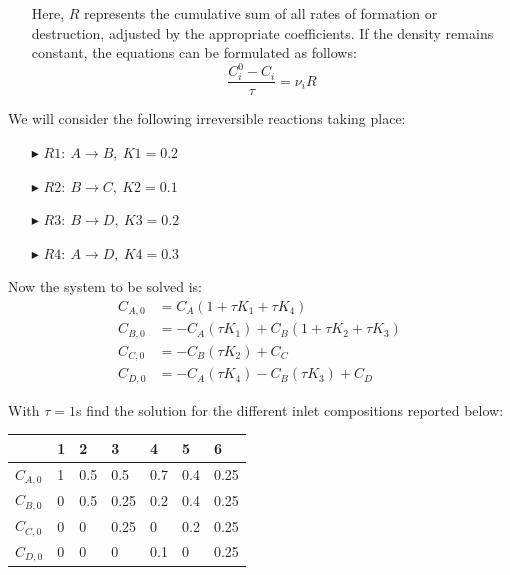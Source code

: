 \documentclass[xcolor={dvipsnames,rgb}, aspectratio=169]{beamer}
\begin{document}
\begin{frame}{}
   \begin{itemize}
      \item[ ] Here, $R$ represents the cumulative sum of all rates of formation or
         destruction, adjusted by the appropriate coefficients. If the density remains
         constant, the equations can be formulated as follows:
         \begin{equation*}
            \frac{C_{i}^{0}-C_{i}}{\tau} = \nu_{i}R
         \end{equation*}
   \end{itemize}
   We will consider the following irreversible reactions taking place:
   \begin{itemize}
      \item[$\blacktriangleright$] $R1:\: A\longrightarrow B,\: K1=0.2$
      \item[$\blacktriangleright$] $R2:\: B\longrightarrow C,\: K2=0.1$
      \item[$\blacktriangleright$] $R3:\: B\longrightarrow D,\: K3=0.2$
      \item[$\blacktriangleright$] $R4:\: A\longrightarrow D,\: K4=0.3$
   \end{itemize}
\end{frame}

\begin{frame}{}
   Now the system to be solved is:\\
   \begin{align*}
      C_{A,0} &= C_{A}\left(1+\tau K_{1} + \tau K_{4}\right) \\
      C_{B,0} &= -C_{A}\left(\tau K_{1}\right) + C_{B}\left(1+\tau K_{2} + \tau K_{3}\right) \\
      C_{C,0} &= -C_{B}\left(\tau K_{2}\right) + C_{C} \\
      C_{D,0} &= -C_{A}\left(\tau K_{4}\right)-C_{B}\left(\tau K_{3}\right) + C_{D}
   \end{align*}

   With $\tau = 1$s find the solution for the different inlet compositions reported
   below:
   \begin{table}
   \centering
   \begin{tabular}{l|l|l|l|l|l|l}
      & 1 & 2   & 3    & 4   & 5   & 6     \\
      \hline
      $C_{A,0}$ & 1 & 0.5 & 0.5  & 0.7 & 0.4 & 0.25  \\
      $C_{B,0}$ & 0 & 0.5 & 0.25 & 0.2 & 0.4 & 0.25  \\
      $C_{C,0}$ & 0 & 0   & 0.25 & 0   & 0.2 & 0.25  \\
      $C_{D,0}$ & 0 & 0   & 0    & 0.1 & 0   & 0.25
   \end{tabular}
   \end{table}
\end{frame}
\end{document}
